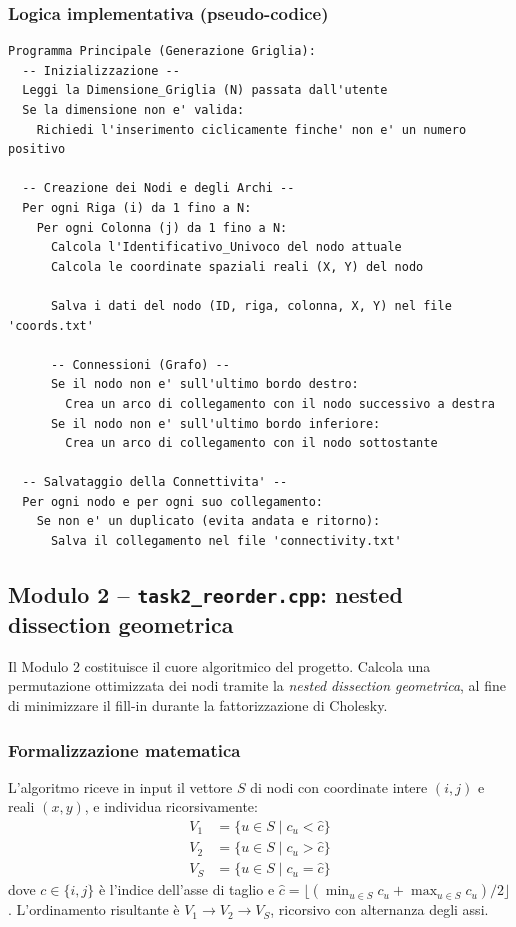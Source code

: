 \documentclass[a4paper,12pt]{article}
\begin{document}
\subsubsection*{Logica implementativa (pseudo-codice)}
\begin{minipage}{\linewidth}
\begin{lstlisting}
Programma Principale (Generazione Griglia):
  -- Inizializzazione --
  Leggi la Dimensione_Griglia (N) passata dall'utente
  Se la dimensione non e' valida:
    Richiedi l'inserimento ciclicamente finche' non e' un numero positivo

  -- Creazione dei Nodi e degli Archi --
  Per ogni Riga (i) da 1 fino a N:
    Per ogni Colonna (j) da 1 fino a N:
      Calcola l'Identificativo_Univoco del nodo attuale
      Calcola le coordinate spaziali reali (X, Y) del nodo
      
      Salva i dati del nodo (ID, riga, colonna, X, Y) nel file 'coords.txt'
      
      -- Connessioni (Grafo) --
      Se il nodo non e' sull'ultimo bordo destro:
        Crea un arco di collegamento con il nodo successivo a destra
      Se il nodo non e' sull'ultimo bordo inferiore:
        Crea un arco di collegamento con il nodo sottostante

  -- Salvataggio della Connettivita' --
  Per ogni nodo e per ogni suo collegamento:
    Se non e' un duplicato (evita andata e ritorno):
      Salva il collegamento nel file 'connectivity.txt'
\end{lstlisting}
\end{minipage}

\clearpage
\subsection*{Modulo 2 -- \texttt{task2\_reorder.cpp}: nested dissection geometrica}

Il Modulo 2 costituisce il cuore algoritmico del progetto. Calcola una permutazione ottimizzata dei nodi tramite la \textit{nested dissection geometrica}, al fine di minimizzare il fill-in durante la fattorizzazione di Cholesky.

\subsubsection*{Formalizzazione matematica}

L'algoritmo riceve in input il vettore $S$ di nodi con coordinate intere $(i,j)$ e reali $(x,y)$, e individua ricorsivamente:
\begin{align*}
  V_1 &= \{ u \in S \mid c_u < \hat{c} \} \\
  V_2 &= \{ u \in S \mid c_u > \hat{c} \} \\
  V_S &= \{ u \in S \mid c_u = \hat{c} \}
\end{align*}
dove $c \in \{i, j\}$ è l'indice dell'asse di taglio e $\hat{c} = \lfloor (\min_{u \in S} c_u + \max_{u \in S} c_u)/2 \rfloor$. L'ordinamento risultante è $V_1 \to V_2 \to V_S$, ricorsivo con alternanza degli assi.
\end{document}
